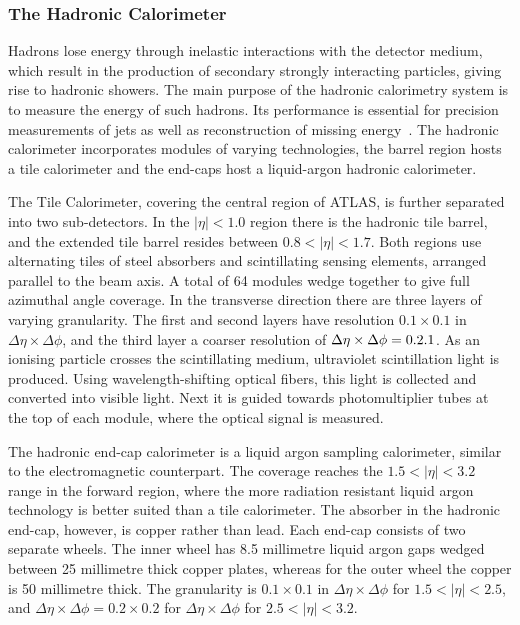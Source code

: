 \subsubsection{The Hadronic Calorimeter}
Hadrons lose energy through inelastic interactions with the detector medium, which result in the production of secondary strongly interacting particles, giving rise to hadronic showers. The main purpose of the hadronic calorimetry system is to measure the energy of such hadrons. Its performance is essential for precision measurements of jets as well as reconstruction of missing energy~\cite{Aaboud:2018scw}. The hadronic calorimeter incorporates modules of varying technologies, the barrel region hosts a tile calorimeter and the end-caps host a liquid-argon hadronic calorimeter. 

The Tile Calorimeter, covering the central region of ATLAS, is further separated into two sub-detectors. In the $|\eta| < 1.0$ region there is the hadronic tile barrel, and the extended tile barrel resides between $0.8 < |\eta| < 1.7$. Both regions use alternating tiles of steel absorbers and scintillating sensing elements, arranged parallel to the beam axis. A total of 64 modules wedge together to give full azimuthal angle coverage. In the transverse direction there are three layers of varying granularity. The first and second layers have resolution $0.1 \times 0.1$ in $\Delta\eta\times\Delta\phi$, and the third layer a coarser resolution of $\Delta\eta\times\Delta\phi = 0.2 \time 0.1$. As an ionising particle crosses the scintillating medium, ultraviolet scintillation light is produced. Using wavelength-shifting optical fibers, this light is collected and converted into visible light. Next it is guided towards photomultiplier tubes at the top of each module, where the optical signal is measured.

The hadronic end-cap calorimeter is a liquid argon sampling calorimeter, similar to the electromagnetic counterpart. The coverage reaches the $1.5 < |\eta| < 3.2$ range in the forward region, where the more radiation resistant liquid argon technology is better suited than a tile calorimeter. The absorber in the hadronic end-cap, however, is copper rather than lead. Each end-cap consists of two separate wheels. The inner wheel has 8.5 millimetre liquid argon gaps wedged between 25 millimetre thick copper plates, whereas for the outer wheel the copper is 50 millimetre thick. The granularity is $0.1 \times 0.1$ in $\Delta\eta\times\Delta\phi$ for $1.5 < |\eta| < 2.5$, and $\Delta\eta\times\Delta\phi = 0.2 \times 0.2$ for $\Delta\eta\times\Delta\phi$ for $2.5 < |\eta| < 3.2$.

